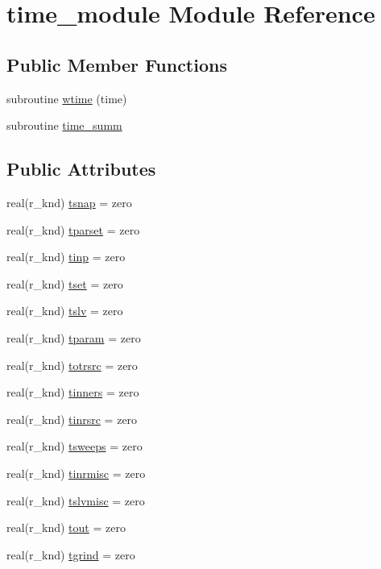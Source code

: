 \hypertarget{classtime__module}{\section{time\-\_\-module Module Reference}
\label{classtime__module}
}
\subsection*{Public Member Functions}
\begin{DoxyCompactItemize}
\item 
subroutine \hyperlink{classtime__module_ad86f74c6ac28ecc6b163c6f777732f28}{wtime} (time)
\item 
subroutine \hyperlink{classtime__module_a43d6d123945fe8057651a3e5875aefce}{time\-\_\-summ}
\end{DoxyCompactItemize}
\subsection*{Public Attributes}
\begin{DoxyCompactItemize}
\item 
real(r\-\_\-knd) \hyperlink{classtime__module_aa8ee658575005edd9d28a62a468cfde2}{tsnap} = zero
\item 
real(r\-\_\-knd) \hyperlink{classtime__module_a5265ce5bfd23e9a9a77547577f88473d}{tparset} = zero
\item 
real(r\-\_\-knd) \hyperlink{classtime__module_a4d112ccfe86d8ab7b0a2c04b98078db3}{tinp} = zero
\item 
real(r\-\_\-knd) \hyperlink{classtime__module_a81f8cc404349dd114670913d2d11f055}{tset} = zero
\item 
real(r\-\_\-knd) \hyperlink{classtime__module_a1f3f475f37c8ce006cdd2de5693552d9}{tslv} = zero
\item 
real(r\-\_\-knd) \hyperlink{classtime__module_ab78f7d01ea1bde455310853bc2be1594}{tparam} = zero
\item 
real(r\-\_\-knd) \hyperlink{classtime__module_a309311ea73088ac5662d6acaf1aca614}{totrsrc} = zero
\item 
real(r\-\_\-knd) \hyperlink{classtime__module_a034b038776e4e01f89f2eee00a20f968}{tinners} = zero
\item 
real(r\-\_\-knd) \hyperlink{classtime__module_a384b45af0c322ff75699b051ec3a96ec}{tinrsrc} = zero
\item 
real(r\-\_\-knd) \hyperlink{classtime__module_aac45a44eaf19a7bea1d8f553c3a552be}{tsweeps} = zero
\item 
real(r\-\_\-knd) \hyperlink{classtime__module_a548875e460521a98bdde436c107d5da0}{tinrmisc} = zero
\item 
real(r\-\_\-knd) \hyperlink{classtime__module_ae8ff3e794ae2fcb536002fc5ba9e6c72}{tslvmisc} = zero
\item 
real(r\-\_\-knd) \hyperlink{classtime__module_a67fe4201db76455b13a6140ddeb5c57d}{tout} = zero
\item 
real(r\-\_\-knd) \hyperlink{classtime__module_a83421671217058a30dcccb2ea5b80cc6}{tgrind} = zero
\end{DoxyCompactItemize}


